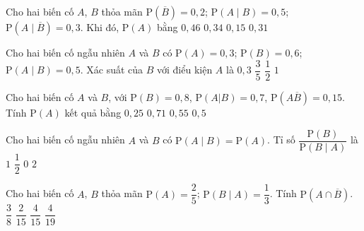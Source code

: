 \begin{ex}%
	Cho hai biến cố $A$, $B$ thỏa mãn $\mathrm{P}\left(\overline{B}\right)=0{,}2$; $\mathrm{P}\left(A\mid B\right)=0{,}5$; $\mathrm{P}\left( A\mid \overline{B}\right)=0{,}3$. Khi  đó, $\mathrm{P}\left(A\right)$ bằng
	\choice 
		 {\True $0{,}46$}
		{$0{,}34$} 
		 {$0{,}15$}
		{$0{,}31$} 
\end{ex}

\begin{ex}%
	Cho hai biến cố ngẫu nhiên $A$ và $B$  có $\mathrm{P}(A)=0{,}3$; $\mathrm{P}(B)=0{,}6$; $\mathrm{P}(A\mid B)=0{,}5$. Xác suất của $B$ với điểu kiện $A$ là
	 \choice
		{$0{,}3$} 
		{$\dfrac{3}{5}$} 
		 {$\dfrac{1}{2}$}
		{\True  $1$}
\end{ex}

\begin{ex}%
	Cho hai biến cố  $A$ và $B$, với $\mathrm{P}(B)=0{,}8$, $\mathrm{P}(A|B)=0{,}7$, $\mathrm{P}(A\overline{B})=0{,}15$. Tính $\mathrm{P}(A)$ kết
	quả bằng 
	 \choice
		 {$0{,}25$}
		{\True  $0{,}71$}
		 {$0{,}55$}
		 {$0{,}5$}
\end{ex}

\begin{ex}%
	Cho hai biến cố ngẫu  nhiên $A$ và $B$ có $\mathrm{P}(A\mid B)=\mathrm{P}(A)$. Tỉ số $\dfrac{\mathrm{P}(B)}{\mathrm{P}(B\mid A)}$ là
	 \choice
		{\True  $1$}
		{$\dfrac{1}{2}$} 
		 {$0$}
		{$2$} 
\end{ex}

\begin{ex}%
	 Cho hai biến cố $A$, $B$ thỏa mãn $\mathrm{P}(A)=\dfrac{2}{5}$; $\mathrm{P}(B\mid A)=\dfrac{1}{3}$. Tính $\mathrm{P}\left(A\cap\overline{B}\right)$.
	 \choice
		 {$\dfrac{3}{8}$}
		 {$\dfrac{2}{15}$}
		{\True  $\dfrac{4}{15}$}
		{$\dfrac{4}{19}$} 
\end{ex}

